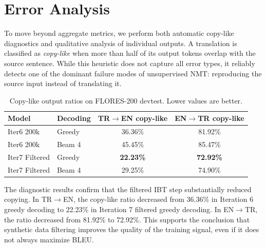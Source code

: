 \documentclass[runningheads]{llncs}
\begin{document}
\section{Error Analysis}
\label{sec:error}

To move beyond aggregate metrics, we perform both automatic copy-like diagnostics and qualitative analysis of individual outputs. A translation is classified as \emph{copy-like} when more than half of its output tokens overlap with the source sentence. While this heuristic does not capture all error types, it reliably detects one of the dominant failure modes of unsupervised NMT: reproducing the source input instead of translating it.

\begin{table}[t]
\centering
\caption{Copy-like output ratios on FLORES-200 devtest. Lower values are better.}
\begin{tabular}{@{}llcc@{}}
\toprule
\textbf{Model} & \textbf{Decoding} & \textbf{TR$\rightarrow$EN copy-like} & \textbf{EN$\rightarrow$TR copy-like} \\
\midrule
Iter6 200k & Greedy & 36.36\% & 81.92\% \\
Iter6 200k & Beam 4 & 45.45\% & 85.47\% \\
Iter7 Filtered & Greedy & \textbf{22.23\%} & \textbf{72.92\%} \\
Iter7 Filtered & Beam 4 & 29.25\% & 74.90\% \\
\bottomrule
\end{tabular}
\label{tab:copy-diagnostics}
\end{table}

The diagnostic results confirm that the filtered IBT step substantially reduced copying. In TR$\rightarrow$EN, the copy-like ratio decreased from 36.36\% in Iteration 6 greedy decoding to 22.23\% in Iteration 7 filtered greedy decoding. In EN$\rightarrow$TR, the ratio decreased from 81.92\% to 72.92\%. This supports the conclusion that synthetic data filtering improves the quality of the training signal, even if it does not always maximize BLEU.
\end{document}
